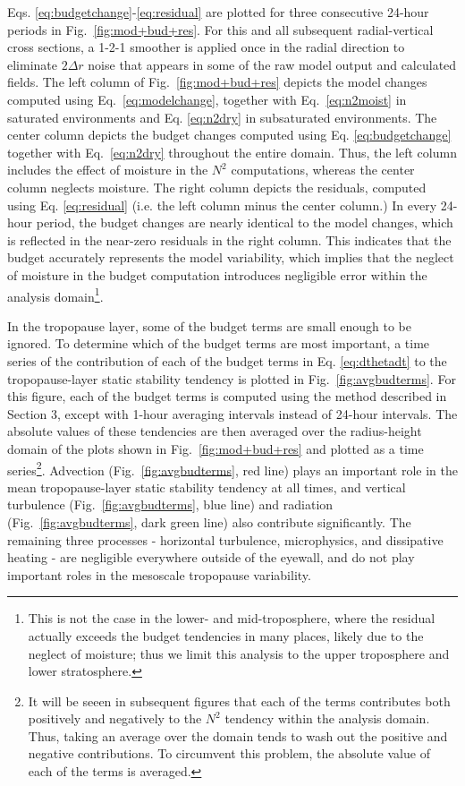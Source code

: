 Eqs. \ref{eq:budgetchange}-\ref{eq:residual} are plotted for three consecutive 24-hour periods in Fig.~\ref{fig:mod+bud+res}.
For this and all subsequent radial-vertical cross sections, a 1-2-1 smoother is applied once in the radial direction to eliminate $2\Delta r$ noise that appears in some of the raw model output and calculated fields.
      The left column of Fig.~\ref{fig:mod+bud+res} depicts the model changes computed using Eq.~\ref{eq:modelchange}, together with Eq.~\ref{eq:n2moist} in saturated environments and Eq. \ref{eq:n2dry} in subsaturated environments.
The center column depicts the budget changes computed using Eq. \ref{eq:budgetchange} together with Eq.~\ref{eq:n2dry} throughout the entire domain.
Thus, the left column includes the effect of moisture in the $N^2$ computations, whereas the center column neglects moisture.
The right column depicts the residuals, computed using Eq. \ref{eq:residual} (i.e. the left column minus the center column.)
In every 24-hour period, the budget changes are nearly identical to the model changes, which is reflected in the near-zero residuals in the right column.
This indicates that the budget accurately represents the model variability, which implies that the neglect of moisture in the budget computation introduces negligible error within the analysis domain\footnote{This is not the case in the lower- and mid-troposphere, where the residual actually exceeds the budget tendencies in many places, likely due to the neglect of moisture; thus we limit this analysis to the upper troposphere and lower stratosphere.}.

In the tropopause layer, some of the budget terms are small enough to be ignored.
To determine which of the budget terms are most important, a time series of the contribution of each of the budget terms in Eq. \ref{eq:dthetadt} to the tropopause-layer static stability tendency is plotted in Fig.~\ref{fig:avgbudterms}.
For this figure, each of the budget terms is computed using the method described in Section 3, except with 1-hour averaging intervals instead of 24-hour intervals.
The absolute values of these tendencies are then averaged over the radius-height domain of the plots shown in Fig.~\ref{fig:mod+bud+res} and plotted as a time series\footnote{It will be seeen in subsequent figures that each of the terms contributes both positively and negatively to the $N^2$ tendency within the analysis domain.
Thus, taking an average over the domain tends to wash out the positive and negative contributions.
To circumvent this problem, the absolute value of each of the terms is averaged.}.
Advection (Fig.~\ref{fig:avgbudterms}, red line) plays an important role in the mean tropopause-layer static stability tendency at all times, and vertical turbulence (Fig.~\ref{fig:avgbudterms}, blue line) and radiation (Fig.~\ref{fig:avgbudterms}, dark green line) also contribute significantly.
The remaining three processes - horizontal turbulence, microphysics, and dissipative heating -  are negligible everywhere outside of the eyewall, and do not play important roles in the mesoscale tropopause variability.

